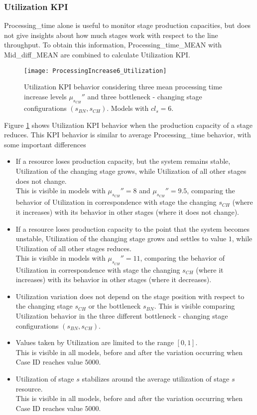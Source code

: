 \subsubsection{Utilization KPI}
Processing\_time alone is useful to monitor stage production capacities, but does not give insights about how much stages work with respect to the line throughput. To obtain this information, Processing\_time\_MEAN with Mid\_diff\_MEAN are combined to calculate Utilization KPI.
\begin{figure}[h] 
\centering
\texttt{[image: ProcessingIncrease6\_Utilization]}
\caption[Utilization KPI behavior with different processing time increase levels]{Utilization KPI behavior considering three mean processing time increase levels $\mu_{s_{CH}}''$ and three bottleneck - changing stage configurations $(s_{BN},s_{CH})$. Models with $cl_s=6$.}
\label{fig:Utilization KPI behavior with different processing time increase levels}
\end{figure}
Figure \ref{fig:Utilization KPI behavior with different processing time increase levels} shows Utilization KPI behavior when the production capacity of a stage reduces. This KPI behavior is similar to average Processing\_time behavior, with some important differences
\begin{itemize}
\item If a resource loses production capacity, but the system remains stable, Utilization of the changing stage grows, while Utilization of all other stages does not change. \\This is visible in models with $\mu_{s_{CH}}''=8$ and $\mu_{s_{CH}}''=9.5$, comparing the behavior of Utilization in correspondence with stage the changing $s_{CH}$ (where it increases) with its behavior in other stages (where it does not change). 
\item If a resource loses production capacity to the point that the system becomes unstable, Utilization of the changing stage grows and settles to value $1$, while Utilization of all other stages reduces. \\This is visible in models with $\mu_{s_{CH}}''=11$, comparing the behavior of Utilization in correspondence with stage the changing $s_{CH}$ (where it increases) with its behavior in other stages (where it decreases). 
\item Utilization variation does not depend on the stage position with respect to the changing stage $s_{CH}$ or the bottleneck $s_{BN}$. This is visible comparing Utilization behavior in the three different bottleneck - changing stage configurations $(s_{BN},s_{CH})$. 
\item Values taken by Utilization are limited to the range $[0,1]$. \\This is visible in all models, before and after the variation occurring when Case ID reaches value $5000$.
\item Utilization of stage $s$ stabilizes around the average utilization of stage $s$ resource. \\This is visible in all models, before and after the variation occurring when Case ID reaches value $5000$.
\end{itemize}
